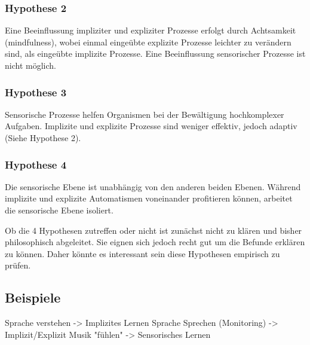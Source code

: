 \documentclass[doc,a4paper,12pt]{apa6}
\begin{document}
\subsubsection{Hypothese 2}

Eine Beeinflussung impliziter und expliziter Prozesse erfolgt durch Achtsamkeit (mindfulness), wobei einmal eingeübte explizite Prozesse leichter zu verändern sind, als eingeübte implizite Prozesse. Eine Beeinflussung sensorischer Prozesse ist nicht möglich.

\subsubsection{Hypothese 3}

Sensorische Prozesse helfen Organismen bei der Bewältigung hochkomplexer Aufgaben. Implizite und explizite Prozesse sind weniger effektiv, jedoch adaptiv (Siehe Hypothese 2).

\subsubsection{Hypothese 4}

Die sensorische Ebene ist unabhängig von den anderen beiden Ebenen. Während implizite und explizite Automatismen voneinander profitieren können, arbeitet die sensorische Ebene isoliert.

Ob die 4 Hypothesen zutreffen oder nicht ist zunächst nicht zu klären und bisher philosophisch abgeleitet. Sie eignen sich jedoch recht gut um die Befunde erklären zu können. Daher könnte es interessant sein diese Hypothesen empirisch zu prüfen.

\subsection{Beispiele}

Sprache verstehen -> Implizites Lernen
Sprache Sprechen (Monitoring) -> Implizit/Explizit
Musik "fühlen" -> Sensorisches Lernen

\end{document}

